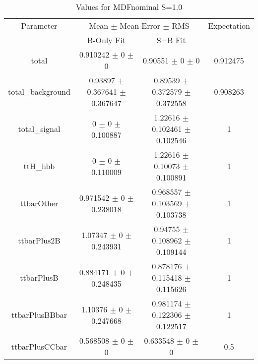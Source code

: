 \begin{table}
\centering
\caption{Values for MDFnominal S=1.0}
\begin{tabular}{cccc}
\toprule
Parameter & \multicolumn{2}{c}{Mean $\pm$ Mean Error $\pm$ RMS} & Expectation\\
 & B-Only Fit & S+B Fit & \\
\midrule
total & \num{0.910242} $\pm$ \num{0} $\pm$ \num{0} & \num{0.90551} $\pm$ \num{0} $\pm$ \num{0} & \num{0.912475}\\
total\_background & \num{0.93897} $\pm$ \num{0.367641} $\pm$ \num{0.367647} & \num{0.89539} $\pm$ \num{0.372579} $\pm$ \num{0.372558} & \num{0.908263}\\
total\_signal & \num{0} $\pm$ \num{0} $\pm$ \num{0.100887} & \num{1.22616} $\pm$ \num{0.102461} $\pm$ \num{0.102546} & \num{1}\\
ttH\_hbb & \num{0} $\pm$ \num{0} $\pm$ \num{0.110009} & \num{1.22616} $\pm$ \num{0.10073} $\pm$ \num{0.100891} & \num{1}\\
ttbarOther & \num{0.971542} $\pm$ \num{0} $\pm$ \num{0.238018} & \num{0.968557} $\pm$ \num{0.103569} $\pm$ \num{0.103738} & \num{1}\\
ttbarPlus2B & \num{1.07347} $\pm$ \num{0} $\pm$ \num{0.243931} & \num{0.94755} $\pm$ \num{0.108962} $\pm$ \num{0.109144} & \num{1}\\
ttbarPlusB & \num{0.884171} $\pm$ \num{0} $\pm$ \num{0.248435} & \num{0.878176} $\pm$ \num{0.115418} $\pm$ \num{0.115626} & \num{1}\\
ttbarPlusBBbar & \num{1.10376} $\pm$ \num{0} $\pm$ \num{0.247668} & \num{0.981174} $\pm$ \num{0.122306} $\pm$ \num{0.122517} & \num{1}\\
ttbarPlusCCbar & \num{0.568508} $\pm$ \num{0} $\pm$ \num{0} & \num{0.633548} $\pm$ \num{0} $\pm$ \num{0} & \num{0.5}\\
\bottomrule
\end{tabular}
\end{table}